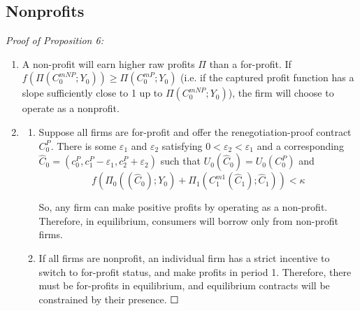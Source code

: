\documentclass[11pt,english]{article}
\theoremstyle{plain}
\theoremstyle{definition}
\begin{document}
\subsection{Nonprofits}

\emph{Proof of Proposition 6:}
\begin{enumerate} [label=\alph*)]
\item A non-profit will earn higher raw
profits $\Pi$ than a for-profit. If $f\left(\Pi\left(C_{0}^{mNP};Y_{0}\right)\right)\geq\Pi\left(C_{0}^{mP};Y_{0}\right)$
(i.e. if the captured profit function has a slope sufficiently close
to 1 up to $\Pi\left(C_{0}^{mNP};Y_{0}\right)$), the firm will choose
to operate as a nonprofit.

\item
\begin{enumerate} [label=\roman*)]
\item Suppose all firms are for-profit and offer the renegotiation-proof
contract $C_{0}^{P}$. There is some $\varepsilon_{1}$ and $\varepsilon_{2}$
satisfying $0<\varepsilon_{2}<\varepsilon_{1}$ and a corresponding
$\hat{C}_{0}=\left(c_{0}^{P},c_{1}^{P}-\varepsilon_{1},c_{2}^{P}+\varepsilon_{2}\right)$
such that $U_{0}\left(\hat{C}_{0}\right)=U_{0}\left(C_{0}^{P}\right)$
and 
\[
f\left(\Pi_{0}\left(\left(\hat{C}_{0}\right);Y_{0}\right)+\Pi_{1}\left(C_{1}^{m1}\left(\hat{C}_{1}\right);\hat{C}_{1}\right)\right)<\kappa
\]

So, any firm can make positive profits by operating as a non-profit.
Therefore, in equilibrium, consumers will borrow only from non-profit
firms.

\item If all firms are nonprofit, an individual firm has a strict incentive
to switch to for-profit status, and make profits in period 1. Therefore,
there must be for-profits in equilibrium, and equilibrium contracts
will be constrained by their presence. $\Square$
\end{enumerate}
\end{enumerate}

%


\end{document}
